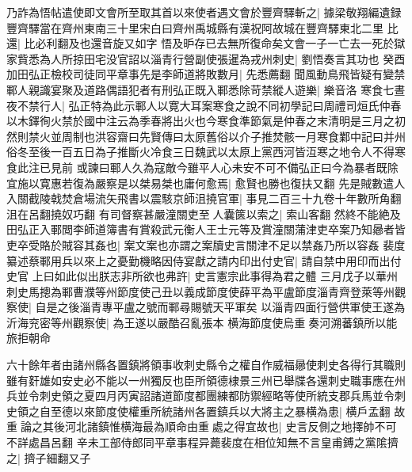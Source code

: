 乃詐為悟帖遣使即文會所至取其首以來使者遇文會於豐齊驛斬之|{
	據梁敬翔編遺録豐齊驛當在齊州東南三十里宋白曰齊州禹城縣有漢祝阿故城在豐齊驛東北二里}
比還|{
	比必利翻及也還音旋又如字}
悟及昈存已去無所復命矣文會一子一亡去一死於獄家貲悉為人所掠田宅没官詔以淄青行營副使張暹為戎州刺史|{
	劉悟奏言其功也}
癸酉加田弘正檢校司徒同平章事先是李師道將敗數月|{
	先悉薦翻}
聞風動鳥飛皆疑有變禁鄆人親識宴聚及道路偶語犯者有刑弘正既入鄆悉除苛禁縱人遊樂|{
	樂音洛}
寒食七晝夜不禁行人|{
	弘正特為此示鄆人以寛大耳案寒食之說不同初學記曰周禮司烜氏仲春以木鐸徇火禁於國中注云為季春將出火也今寒食準節氣是仲春之末清明是三月之初然則禁火並周制也洪容齋曰先賢傳曰太原舊俗以介子推焚骸一月寒食鄴中記曰并州俗冬至後一百五日為子推斷火冷食三日魏武以太原上黨西河皆沍寒之地令人不得寒食此注已見前}
或諫曰鄆人久為寇敵今雖平人心未安不可不備弘正曰今為暴者既除宜施以寛惠若復為嚴察是以桀易桀也庸何愈焉|{
	愈賢也勝也復扶又翻}
先是賊數遣人入關截陵戟焚倉場流矢飛書以震駭京師沮撓官軍|{
	事見二百三十九卷十年數所角翻沮在呂翻撓奴巧翻}
有司督察甚嚴潼關吏至人囊篋以索之|{
	索山客翻}
然終不能絶及田弘正入鄆閲李師道簿書有賞殺武元衡人王士元等及賞潼關蒲津吏卒案乃知曏者皆吏卒受賂於賊容其姦也|{
	案文案也亦謂之案牘史言關津不足以禁姦乃所以容姦}
裴度纂述蔡鄆用兵以來上之憂勤機略因侍宴獻之請内印出付史官|{
	請自禁中用印而出付史官}
上曰如此似出朕志非所欲也弗許|{
	史言憲宗此事得為君之體}
三月戊子以華州刺史馬摠為鄆曹濮等州節度使己丑以義成節度使薛平為平盧節度淄青齊登萊等州觀察使|{
	自是之後淄青專平盧之號而鄆尋賜號天平軍矣}
以淄青四面行營供軍使王遂為沂海兖密等州觀察使|{
	為王遂以嚴酷召亂張本}
横海節度使烏重奏河溯蕃鎮所以能旅拒朝命

六十餘年者由諸州縣各置鎮將領事收刺史縣令之權自作威福曏使刺史各得行其職則雖有姧雄如安史必不能以一州獨反也臣所領德棣景三州已舉牒各還刺史職事應在州兵並令刺史領之夏四月丙寅詔諸道節度都團練都防禦經略等使所統支郡兵馬並令刺史領之自至德以來節度使權重所統諸州各置鎮兵以大將主之暴横為患|{
	横戶孟翻}
故重論之其後河北諸鎮惟横海最為順命由重處之得宜故也|{
	史言反側之地擇帥不可不詳處昌呂翻}
辛未工部侍郎同平章事程异薨裴度在相位知無不言皇甫鎛之黨隂擠之|{
	擠子細翻又子}


